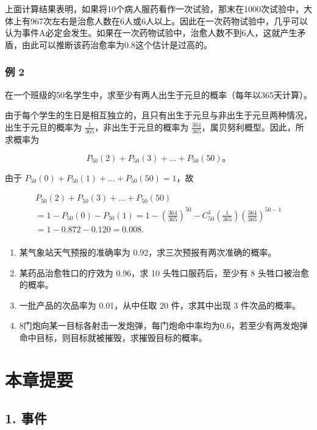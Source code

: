 上面计算结果表明，如果将10个病人服药看作一次试验，那末在1000次试验中，大体上有967次左右是治愈人数在6人或6人以上。因此在一次药物试验中，几乎可以认为事件A必定会发生。如果在一次药物试验中，治愈人数不到6人，这就产生矛盾，由此可以推断该药治愈率为0.8这个估计是过高的。

\subsubsection{例 2}

在一个班级的50名学生中，求至少有两人出生于元旦的概率（每年以365天计算）。

由于每个学生的生日是相互独立的，且只有出生于元旦与非出生于元旦两种情况，出生于元旦的概率为
\(\frac{1}{365}\)，非出生于元旦的概率为
\(\frac{364}{365}\)，属贝努利概型。因此，所求概率为

\[
P _ {50} (2) + P _ {50} (3) + \dots + P _ {50} (50)\text{。}
\]

由于 \(P_{50}(0) + P_{50}(1) + \dots + P_{50}(50) = 1\)，故

\[
\begin{array}{l} P _ {50} (2) + P _ {50} (3) + \dots + P _ {50} (50) \\ = 1 - P _ {50} (0) - P _ {50} (1) = 1 - \left(\frac {364}{365}\right) ^ {50} - C _ {50} ^ {1} \left(\frac {1}{365}\right) \left(\frac {364}{365}\right) ^ {50 - 1} \\ = 1 - 0.872 - 0.120 = 0.008. \\ \end{array}
\]

\begin{enumerate}
\item
  某气象站天气预报的准确率为 0.92，求三次预报有两次准确的概率。
\item
  某药品治愈牲口的疗效为 0.96，求 10 头牲口服药后，至少有 8
  头牲口被治愈的概率。
\item
  一批产品的次品率为 0.01，从中任取 20 件，求其中出现 3 件次品的概率。
\item
  8门炮向某一目标各射击一发炮弹，每门炮命中率均为0.6，若至少有两发炮弹命中目标，则目标就被摧毁，求摧毁目标的概率。
\end{enumerate}

\section{本章提要}

\subsection{1. 事件}

